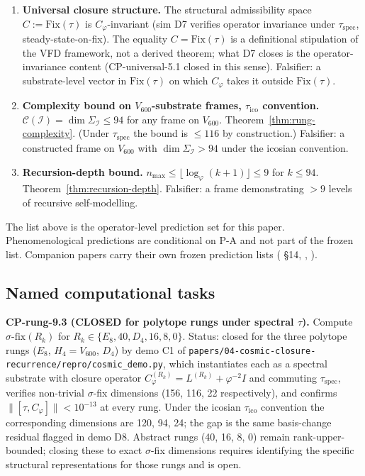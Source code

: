 \documentclass[11pt]{article}
\theoremstyle{plain}
\theoremstyle{definition}
\theoremstyle{remark}
\newcommand{\Ical}{\mathcal{I}}
\newcommand{\Ccal}{\mathcal{C}}
\newcommand{\Fix}{\mathrm{Fix}}
\newcommand{\Cph}{C_\varphi}
\begin{document}
\begin{enumerate}[leftmargin=2em, label=\textbf{F\arabic*.}]
\item \textbf{Universal closure structure.} The structural admissibility space $C := \Fix(\tau)$ is $\Cph$-invariant (sim D7 verifies operator invariance under $\tau_{\mathrm{spec}}$, steady-state-on-fix). The equality $C = \Fix(\tau)$ is a definitional stipulation of the VFD framework, not a derived theorem; what D7 closes is the operator-invariance content (CP-universal-5.1 closed in this sense). Falsifier: a substrate-level vector in $\Fix(\tau)$ on which $\Cph$ takes it outside $\Fix(\tau)$.
\item \textbf{Complexity bound on $V_{600}$-substrate frames, $\tau_{\mathrm{ico}}$ convention.} $\Ccal(\Ical) = \dim \Sigma_\Ical \leq 94$ for any frame on $V_{600}$. Theorem~\ref{thm:rung-complexity}. (Under $\tau_{\mathrm{spec}}$ the bound is $\leq 116$ by construction.) Falsifier: a constructed frame on $V_{600}$ with $\dim \Sigma_\Ical > 94$ under the icosian convention.
\item \textbf{Recursion-depth bound.} $n_{\max} \leq \lfloor \log_\varphi(k+1) \rfloor \leq 9$ for $k \leq 94$. Theorem~\ref{thm:recursion-depth}. Falsifier: a frame demonstrating $> 9$ levels of recursive self-modelling.
\end{enumerate}

The list above is the operator-level prediction set for this paper. Phenomenological predictions are conditional on P-A and not part of the frozen list. Companion papers carry their own frozen prediction lists (\citep{SmartLifeAsClosure} §14, \citep{SmartProcessingToPOV}, \citep{SmartCosmicClosure}).

\subsection{Named computational tasks}

\textbf{CP-rung-9.3 (CLOSED for polytope rungs under spectral $\tau$).} Compute $\sigma\text{-fix}(R_k)$ for $R_k \in \{E_8, 40, D_4, 16, 8, 0\}$. Status: closed for the three polytope rungs ($E_8$, $H_4 = V_{600}$, $D_4$) by demo C1 of \texttt{papers/04-cosmic-closure-recurrence/repro/cosmic\_demo.py}, which instantiates each as a spectral substrate with closure operator $\Cph^{(R_k)} = L^{(R_k)} + \varphi^{-2} I$ and commuting $\tau_{\mathrm{spec}}$, verifies non-trivial $\sigma$-fix dimensions (156, 116, 22 respectively), and confirms $\|[\tau, \Cph]\| < 10^{-13}$ at every rung. Under the icosian $\tau_{\mathrm{ico}}$ convention the corresponding dimensions are 120, 94, 24; the gap is the same basis-change residual flagged in demo D8. Abstract rungs (40, 16, 8, 0) remain rank-upper-bounded; closing these to exact $\sigma$-fix dimensions requires identifying the specific structural representations for those rungs and is open.
\end{document}
